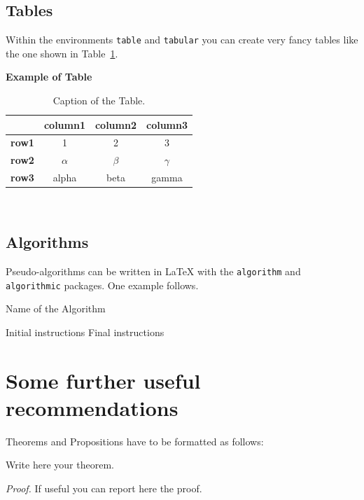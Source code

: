 \documentclass[11pt,a4paper,twocolumn]{article}
\begin{document}
\subsection{Tables}
\label{subsec:tables}

Within the environments \texttt{table} and  \texttt{tabular} you can create very fancy tables like the one shown in Table~\ref{table:example}.
\begin{table}[H]
    \caption*{\textbf{Example of Table}}
    \centering 
    \begin{tabular}{|p{3em} c c c |}
    \hline
    \rowcolor{bluePoli!40}
     & \textbf{column1} & \textbf{column2} & \textbf{column3} \T\B \\
    \hline \hline
    \textbf{row1} & 1 & 2 & 3 \T\B \\
    \textbf{row2} & $\alpha$ & $\beta$ & $\gamma$ \T\B\\
    \textbf{row3} & alpha & beta & gamma \B\\
    \hline
    \end{tabular}
    \\[10pt]
    \caption{Caption of the Table.}
    \label{table:example}
\end{table}

\subsection{Algorithms}
\label{subsec:algorithms}

Pseudo-algorithms can be written in \LaTeX{} with the \texttt{algorithm} and \texttt{algorithmic} packages.
One example follows.
\begin{algorithm}[H]
\label{alg:example}
\caption{Name of the Algorithm}
\label{alg:var}
\label{protocol1}
\begin{algorithmic}[1]
\STATE Initial instructions
\ENDIF
\ENDFOR
{}
\ENDWHILE
\STATE Final instructions
\end{algorithmic}
\end{algorithm} 

\section{Some further useful recommendations}

Theorems and Propositions have to be formatted as follows:
\begin{theorem}
\label{a_theorem}
Write here your theorem. 
\end{theorem}
\textit{Proof.} If useful you can report here the proof.
\vspace{0.3cm} %
\end{document}
